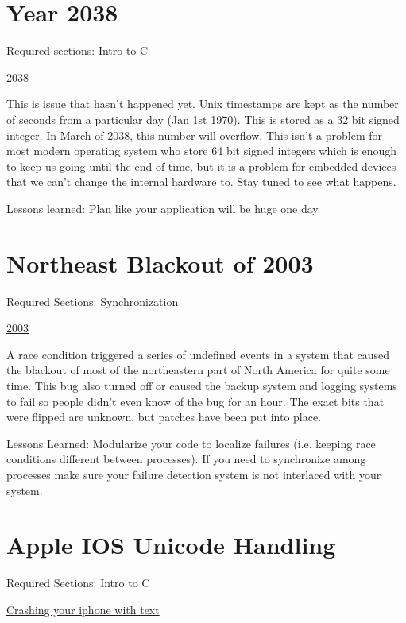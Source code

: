 \section{Year 2038}

Required sections: Intro to C

\href{https://en.wikipedia.org/wiki/Year_2038_problem}{2038}

This is issue that hasn't happened yet.
Unix timestamps are kept as the number of seconds from a particular day (Jan 1st 1970).
This is stored as a 32 bit signed integer.
In March of 2038, this number will overflow.
This isn't a problem for most modern operating system who store 64 bit signed integers which is enough to keep us going until the end of time, but it is a problem for embedded devices that we can't change the internal hardware to.
Stay tuned to see what happens.

Lessons learned: Plan like your application will be huge one day.

\section{Northeast Blackout of 2003}

Required Sections: Synchronization

\href{https://en.wikipedia.org/wiki/Northeast_blackout_of_2003}{2003}

A race condition triggered a series of undefined events in a system that caused the blackout of most of the northeastern part of North America for quite some time.
This bug also turned off or caused the backup system and logging systems to fail so people didn't even know of the bug for an hour. The exact bits that were flipped are unknown, but patches have been put into place.

Lessons Learned: Modularize your code to localize failures (i.e. keeping race conditions different between processes). If you need to synchronize among processes make sure your failure detection system is not interlaced with your system.


\section{Apple IOS Unicode Handling}

Required Sections: Intro to C

\href{http://appleinsider.com/articles/15/05/26/bug-in-ios-notifications-handling-crashes-iphones-with-a-simple-text}{Crashing your iphone with text}

